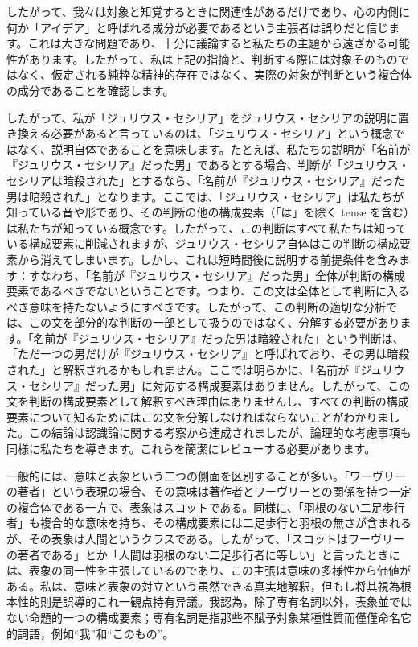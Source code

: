\documentclass[a4paper,11pt,openany]{ltjsbook}
\begin{document}
したがって、我々は対象と知覚するときに関連性があるだけであり、心の内側に何か「アイデア」と呼ばれる成分が必要であるという主張者は誤りだと信じます。これは大きな問題であり、十分に議論すると私たちの主題から遠ざかる可能性があります。したがって、私は上記の指摘と、判断する際には対象そのものではなく、仮定される純粋な精神的存在ではなく、実際の対象が判断という複合体の成分であることを確認します。

したがって、私が「ジュリウス・セシリア」をジュリウス・セシリアの説明に置き換える必要があると言っているのは、「ジュリウス・セシリア」という概念ではなく、説明自体であることを意味します。たとえば、私たちの説明が「名前が『ジュリウス・セシリア』だった男」であるとする場合、判断が「ジュリウス・セシリアは暗殺された」とするなら、「名前が『ジュリウス・セシリア』だった男は暗殺された」となります。ここでは、「ジュリウス・セシリア」は私たちが知っている音や形であり、その判断の他の構成要素（「は」を除く tense を含む）は私たちが知っている概念です。したがって、この判断はすべて私たちは知っている構成要素に削減されますが、ジュリウス・セシリア自体はこの判断の構成要素から消えてしまいます。しかし、これは短時間後に説明する前提条件を含みます：すなわち、「名前が『ジュリウス・セシリア』だった男」全体が判断の構成要素であるべきでないということです。つまり、この文は全体として判断に入るべき意味を持たないようにすべきです。したがって、この判断の適切な分析では、この文を部分的な判断の一部として扱うのではなく、分解する必要があります。「名前が『ジュリウス・セシリア』だった男は暗殺された」という判断は、「ただ一つの男だけが『ジュリウス・セシリア』と呼ばれており、その男は暗殺された」と解釈されるかもしれません。ここでは明らかに、「名前が『ジュリウス・セシリア』だった男」に対応する構成要素はありません。したがって、この文を判断の構成要素として解釈すべき理由はありませんし、すべての判断の構成要素について知るためにはこの文を分解しなければならないことがわかりました。この結論は認識論に関する考察から達成されましたが、論理的な考慮事項も同様に私たちを導きます。これらを簡潔にレビューする必要があります。


一般的には、意味と表象という二つの側面を区別することが多い。「ワーヴリーの著者」という表現の場合、その意味は著作者とワーヴリーとの関係を持つ一定の複合体である一方で、表象はスコットである。同様に、「羽根のない二足歩行者」も複合的な意味を持ち、その構成要素には二足歩行と羽根の無さが含まれるが、その表象は人間というクラスである。したがって、「スコットはワーヴリーの著者である」とか「人間は羽根のない二足歩行者に等しい」と言ったときには、表象の同一性を主張しているのであり、この主張は意味の多様性から価値がある。私は、意味と表象の対立という虽然できる真実地解釈，但もし将其視為根本性的則是誤導的これ一観点持有异議。我認為，除了専有名詞以外，表象並ではない命題的一つの構成要素；専有名詞是指那些不賦予対象某種性質而僅僅命名它的詞語，例如“我”和“このもの”。
\end{document}
